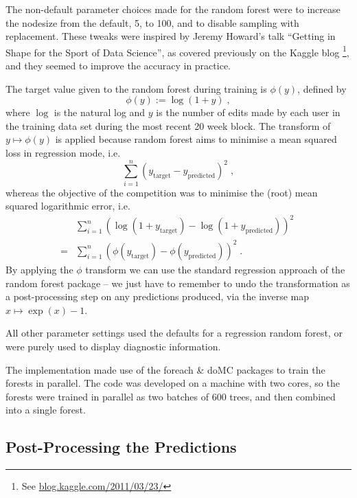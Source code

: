 \documentclass[12pt]{article}
\begin{document}
The non-default parameter choices made for the random forest
were to increase the nodesize from the default, 5, to 100, and
to disable sampling with replacement. These tweaks were inspired
by Jeremy Howard's talk ``Getting in Shape for the Sport of
Data Science'', as covered previously on the Kaggle blog
\footnote{
See \url{blog.kaggle.com/2011/03/23/}
}, and they seemed to improve the accuracy in practice.

The target value given to the random forest during training is $\phi(y)$,
defined by
\begin{equation*}
\phi(y) := \log(1 + y) \;,
\end{equation*}
where $\log$ is the natural log and $y$ is the number of edits
made by each user in the training data set during the most
recent 20 week block. The transform of $y \mapsto \phi(y)$ is
applied because random forest aims to minimise a mean squared
loss in regression mode, i.e.
\begin{equation*}
\sum_{i=1}^n \left( y_{\mathrm{target}} - y_{\mathrm{predicted}}\right)^2 \;,
\end{equation*}
whereas the objective of the competition was to minimise the (root)
mean squared logarithmic error, i.e.
\begin{align*}
& \sum_{i=1}^n \left( \log(1 + y_{\mathrm{target}}) -
\log(1 + y_{\mathrm{predicted}})\right)^2 \; \\
= &
\sum_{i=1}^n \left( \phi(y_{\mathrm{target}}) - \phi(y_{\mathrm{predicted}})\right)^2 \;.
\end{align*}
By applying the $\phi$ transform we can use the standard regression approach
of the random forest package -- we just have to remember to undo the transformation
as a post-processing step on any predictions produced, via the inverse map
$x \mapsto \exp(x) - 1$.

All other parameter settings used the defaults for a regression random forest, or
were purely used to display diagnostic information.

The implementation made use of the foreach \& doMC packages to train the forests
in parallel. The code was developed on a machine with two cores, so the forests
were trained in parallel as two batches of 600 trees, and then combined into a
single forest.

\subsection{Post-Processing the Predictions}
\end{document}
